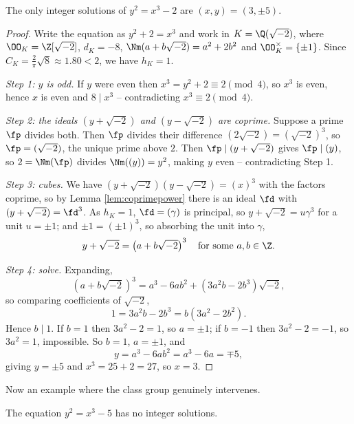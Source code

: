 \begin{theorem}\label{thm:mordell2}
	The only integer solutions of $y^2 = x^3 - 2$ are $(x,y) = (3,\pm5)$.
\end{theorem}

\begin{proof}
	Write the equation as $y^2 + 2 = x^3$ and work in $K = \Q(\sqrt{-2})$, where $\OO_K = \Z[\sqrt{-2}]$, $d_K = -8$, $\Nm(a+b\sqrt{-2}) = a^2+2b^2$ and $\OO_K^\times = \{\pm1\}$. Since $C_K = \tfrac2\pi\sqrt8 \approx 1.80 < 2$, we have $h_K = 1$.

	\emph{Step 1: $y$ is odd.} If $y$ were even then $x^3 = y^2+2 \equiv 2 \pmod 4$, so $x^3$ is even, hence $x$ is even and $8 \mid x^3$ -- contradicting $x^3 \equiv 2\pmod4$.

	\emph{Step 2: the ideals $(y+\sqrt{-2})$ and $(y-\sqrt{-2})$ are coprime.} Suppose a prime $\fp$ divides both. Then $\fp$ divides their difference $(2\sqrt{-2}) = (\sqrt{-2})^3$, so $\fp = (\sqrt{-2})$, the unique prime above $2$. Then $\fp \mid (y+\sqrt{-2})$ gives $\fp \mid (y)$, so $2 = \Nm(\fp)$ divides $\Nm((y)) = y^2$, making $y$ even -- contradicting Step 1.

	\emph{Step 3: cubes.} We have $(y+\sqrt{-2})(y-\sqrt{-2}) = (x)^3$ with the factors coprime, so by Lemma \ref{lem:coprimepower} there is an ideal $\fd$ with $(y+\sqrt{-2}) = \fd^3$. As $h_K = 1$, $\fd = (\gamma)$ is principal, so $y+\sqrt{-2} = u\gamma^3$ for a unit $u = \pm1$; and $\pm1 = (\pm1)^3$, so absorbing the unit into $\gamma$,
	$$y+\sqrt{-2} = \left(a+b\sqrt{-2}\right)^3 \quad\text{for some } a, b \in \Z.$$

	\emph{Step 4: solve.} Expanding,
	$$\left(a+b\sqrt{-2}\right)^3 = a^3 - 6ab^2 + \left(3a^2b - 2b^3\right)\sqrt{-2},$$
	so comparing coefficients of $\sqrt{-2}$,
	$$1 = 3a^2b - 2b^3 = b\left(3a^2-2b^2\right).$$
	Hence $b \mid 1$. If $b = 1$ then $3a^2-2 = 1$, so $a = \pm1$; if $b = -1$ then $3a^2-2 = -1$, so $3a^2 = 1$, impossible. So $b = 1$, $a = \pm1$, and
	$$y = a^3-6ab^2 = a^3 - 6a = \mp 5,$$
	giving $y = \pm5$ and $x^3 = 25+2 = 27$, so $x = 3$.
\end{proof}

Now an example where the class group genuinely intervenes.

\begin{theorem}\label{thm:mordell5}
	The equation $y^2 = x^3-5$ has no integer solutions.
\end{theorem}

